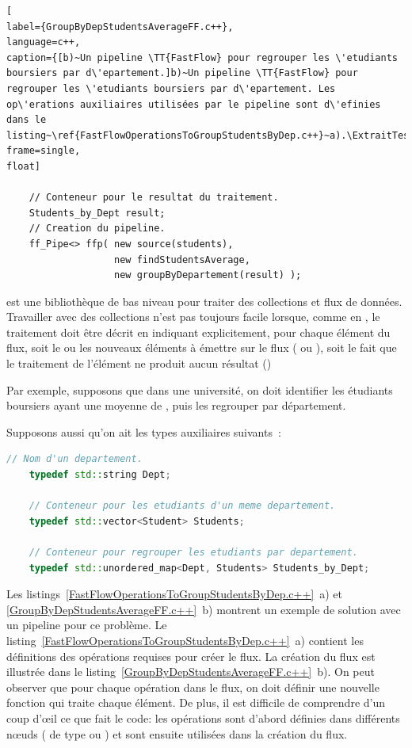 \addtocounter{lstlisting}{-1}

\begin{lstlisting}[
label={GroupByDepStudentsAverageFF.c++},
language=c++,
caption={[b)~Un pipeline \TT{FastFlow} pour regrouper les \'etudiants boursiers par d\'epartement.]b)~Un pipeline \TT{FastFlow} pour regrouper les \'etudiants boursiers par d\'epartement. Les op\'erations auxiliaires utilisées par le pipeline sont d\'efinies dans le listing~\ref{FastFlowOperationsToGroupStudentsByDep.c++}~a).\ExtraitTestUnitaire},
frame=single,
float]

	// Conteneur pour le resultat du traitement.
	Students_by_Dept result;
	// Creation du pipeline.
	ff_Pipe<> ffp( new source(students),
				   new findStudentsAverage,
				   new groupByDepartement(result) );        

\end{lstlisting}

 est une biblioth\`eque de bas niveau pour traiter des collections et flux de donn\'ees. Travailler avec des collections n'est pas toujours facile lorsque, comme en , le traitement doit être décrit en indiquant explicitement, pour chaque élément du flux,  soit le ou les nouveaux éléments à émettre sur le flux ( ou ), soit le fait que le traitement de l'élément ne produit aucun résultat ()

Par exemple, supposons que dans une universit\'e, on doit identifier les \'etudiants boursiers ayant une moyenne de , puis les regrouper par d\'epartement.

\goodbreak
\begin{samepage}
Supposons aussi qu'on ait les types auxiliaires suivants~:
\begin{lstlisting}[language=c++]
    // Nom d'un departement.
    typedef std::string Dept;
    
    // Conteneur pour les etudiants d'un meme departement.
    typedef std::vector<Student> Students;

    // Conteneur pour regrouper les etudiants par departement.
    typedef std::unordered_map<Dept, Students> Students_by_Dept; 
\end{lstlisting}
\end{samepage}


Les listings~\ref{FastFlowOperationsToGroupStudentsByDep.c++}~a) et \ref{GroupByDepStudentsAverageFF.c++}~b) montrent un exemple de solution avec un pipeline  pour ce problème. Le listing~\ref{FastFlowOperationsToGroupStudentsByDep.c++}~a) contient les définitions des opérations requises pour créer le flux. La création du flux est illustrée dans le listing~\ref{GroupByDepStudentsAverageFF.c++}~b). On peut observer que pour chaque op\'eration dans le flux, on doit définir une nouvelle fonction qui traite chaque élément. De plus, il est difficile de comprendre d'un coup d'œil ce que fait le code: les op\'erations sont d'abord d\'efinies dans diff\'erents nœuds ( de type  ou ) et sont ensuite utilis\'ees dans la cr\'eation du flux. 

